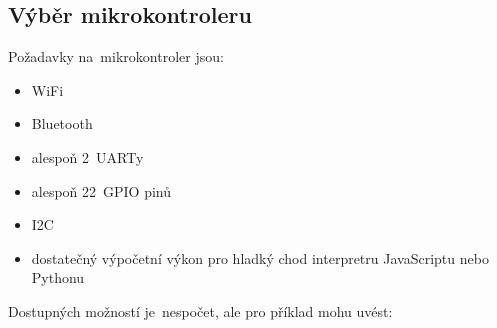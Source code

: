 \subsection{Výběr mikrokontroleru \label{subs:vyberMikrokontroleru}}
Požadavky na~mikrokontroler jsou:
\begin{itemize}
    \item WiFi
    \item Bluetooth
    \item alespoň 2~UARTy
    \item alespoň 22~GPIO pinů
    \item I2C
    \item dostatečný výpočetní výkon pro hladký chod interpretru JavaScriptu nebo Pythonu
\end{itemize}

Dostupných možností je~nespočet, ale pro příklad mohu uvést:

